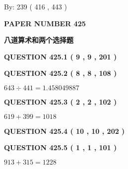 \documentclass{ctexart}
\begin{document}
   
\hspace{1.0in} By: 
 239 ( 416 ,  443 )
   
   
   
   
\newpage 
\setcounter{page}{ 
   425001 } 
   
   
   
   
 {\textbf{ \Large{ PAPER NUMBER  425  }}}
   
   
\vspace{0.2in}
   
   
   
   
   
   
 \vspace{0.2in}
{\LARGE {\textbf{ 八道算术和两个选择题}}}
   
   
  
\vspace{0.2in}
  
{\textbf{\Large{QUESTION
425.1 
 ( 9 , 9 , 201 )
}}}
  
  
  
\vspace{0.2in}
  
{\textbf{\Large{QUESTION
425.2 
 ( 8 , 8 , 108 )
}}}
  
  
 
 

$ %
643 \div  %
441=   %
1.458049887$
 
 
  
\vspace{0.2in}
  
{\textbf{\Large{QUESTION
425.3 
 ( 2 , 2 , 102 )
}}}
  
  
 
 

$ %
619 +  %
399=   %
1018$
 
 
  
\vspace{0.2in}
  
{\textbf{\Large{QUESTION
425.4 
 ( 10 , 10 , 202 )
}}}
  
  
  
\vspace{0.2in}
  
{\textbf{\Large{QUESTION
425.5 
 ( 1 , 1 , 101 )
}}}
  
  
 
 

$ %
913 +  %
315=   %
1228$
 
 
  
\end{document}
